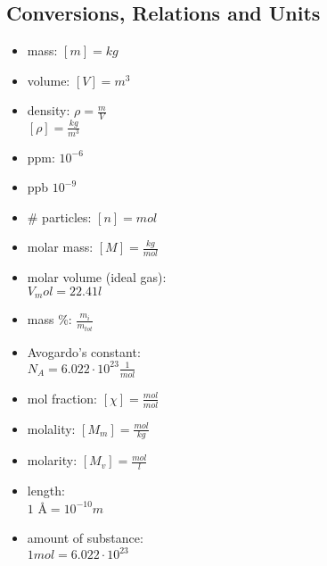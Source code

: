 \subsection{Conversions, Relations and Units}
\begin{minipage}[t]{0.23 \columnwidth}
\begin{itemize}[leftmargin=0.20cm, itemsep=0.05pt]
    \item mass: $[m] = kg$
    \item volume: $[V] = m^3$ 
    \item density: $\rho = \frac{m}{V}$\\
    $[\rho] = \frac{kg}{m^3}$
    \item ppm: $10^{-6}$
    \item ppb $10^{-9}$
    \item \# particles: $[n] = mol$
    \item molar mass: $[M] = \frac{kg}{mol}$
    \item molar volume (ideal gas):\\
    $V_mol = 22.41l$
\end{itemize}
\end{minipage}
\begin{minipage}[t]{0.23 \columnwidth}
\begin{itemize}[leftmargin=0.20cm, itemsep=0.05pt]
    \item mass \%: $\frac{m_i}{m_{tot}}$ 
    \item Avogardo's constant: \\
    $N_A = 6.022 \cdot 10^{23} \frac{1}{mol}$
    \item mol fraction: $[\chi] = \frac{mol}{mol}$
    \item molality: $[M_m] = \frac{mol}{kg}$
    \item molarity: $[M_v] = \frac{mol}{l}$
    \item length:\\
    $1$ \AA $= 10^{-10}m$
    \item amount of substance:\\
    $1 mol = 6.022 \cdot 10^{23}$
\end{itemize}
\end{minipage}
